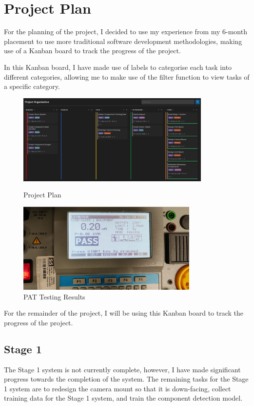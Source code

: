 \section{Project Plan}
\label{sec:projectplan}
For the planning of the project, I decided to use my experience from my 6-month placement to use more traditional software development methodologies,
making use of a Kanban board to track the progress of the project.

In this Kanban board, I have made use of labels to categorise each task into different categories, allowing me to make use
of the filter function to view tasks of a specific category.

\begin{figure}[t]
  \begin{minipage}[t]{0.49\textwidth}
    \centering
    \includegraphics[width=\textwidth,height=4.5cm]{imgs/software/projectplan.jpg}
    \caption{Project Plan}
  \end{minipage}
  \hfill 
  \begin{minipage}[t]{0.49\textwidth}
      \centering
      \includegraphics[width=\textwidth,height=4.5cm]{imgs/pattesting.jpeg}
      \caption{PAT Testing Results}
      \label{fig:pat}
    \end{minipage}
    \hfill
\end{figure}

For the remainder of the project, I will be using this Kanban board to track the progress of the project. 
 \subsection{Stage 1}
The Stage 1 system is not currently complete, however, I have made significant progress towards the completion of the system. The remaining
tasks for the Stage 1 system are to redesign the camera mount so that it is down-facing, collect training data for the Stage 1 system, and
train the component detection model. 

